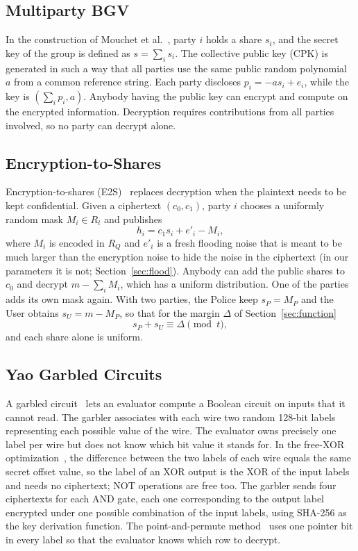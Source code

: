 \documentclass[conference,letterpaper]{IEEEtran}
\begin{document}
\subsection{Multiparty BGV}\label{sec:mpbgv}
In the construction of Mouchet et al.~\cite{mouchet}, party $i$ holds a share $s_i$, and the secret key of the group is defined as $s = \sum_i s_i$. The collective public key (CPK) is generated in such a way that all parties use the same public random polynomial $a$ from a common reference string. Each party discloses $p_i = -a s_i + e_i$, while the key is $(\sum_i p_i, a)$. Anybody having the public key can encrypt and compute on the encrypted information. Decryption requires contributions from all parties involved, so no party can decrypt alone.

\subsection{Encryption-to-Shares}\label{sec:e2s}
Encryption-to-shares (E2S)~\cite{mouchet} replaces decryption when the plaintext needs to be kept confidential. Given a ciphertext $(c_0, c_1)$, party $i$ chooses a uniformly random mask $M_i \in R_t$ and publishes
\begin{equation}
h_i = c_1 s_i + e'_i - M_i,
\end{equation}
where $M_i$ is encoded in $R_Q$ and $e'_i$ is a fresh flooding noise that is meant to be much larger than the encryption noise to hide the noise in the ciphertext (in our parameters it is not; Section~\ref{sec:flood}). Anybody can add the public shares to $c_0$ and decrypt $m - \sum_i M_i$, which has a uniform distribution. One of the parties adds its own mask again. With two parties, the Police keep $s_P = M_P$ and the User obtains $s_U = m - M_P$, so that for the margin $\Delta$ of Section~\ref{sec:function}
\begin{equation}
s_P + s_U \equiv \Delta \pmod{t},
\end{equation}
and each share alone is uniform.

\subsection{Yao Garbled Circuits}\label{sec:gc}
A garbled circuit~\cite{yao86,bhr12} lets an evaluator compute a Boolean circuit on inputs that it cannot read. The garbler associates with each wire two random 128-bit labels representing each possible value of the wire. The evaluator owns precisely one label per wire but does not know which bit value it stands for. In the free-XOR optimization~\cite{freexor}, the difference between the two labels of each wire equals the same secret offset value, so the label of an XOR output is the XOR of the input labels and needs no ciphertext; NOT operations are free too. The garbler sends four ciphertexts for each AND gate, each one corresponding to the output label encrypted under one possible combination of the input labels, using SHA-256 as the key derivation function. The point-and-permute method~\cite{bmr90} uses one pointer bit in every label so that the evaluator knows which row to decrypt.
\end{document}
